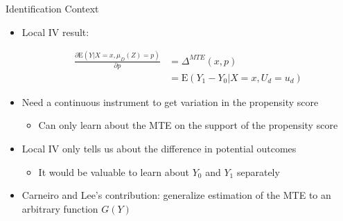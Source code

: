 \documentclass{beamer}
\newcommand{\E}{\mathrm{E}} %
\begin{document}
\begin{frame}{Identification Context}

\begin{itemize}

\item Local IV result:

\begin{align*}
  \frac{\partial \E \left( Y | X = x, \mu_D(Z) = p \right) }{\partial p} &= \Delta^{MTE}(x, p) \\
  &= \E \left( Y_1 - Y_0 | X = x, U_d = u_d \right)
\end{align*}


\item Need a continuous instrument to get variation in the propensity
  score
\begin{itemize}
\item Can only learn about the MTE on the support of the propensity
  score
\end{itemize}


\pause

\item Local IV only tells us about the difference in potential
  outcomes
\begin{itemize}
\item It would be valuable to learn about $Y_0$ and $Y_1$ separately
\end{itemize}

\item Carneiro and Lee's contribution: generalize estimation of the
  MTE to an arbitrary function $G(Y)$

\end{itemize}

\end{frame}
\end{document}
